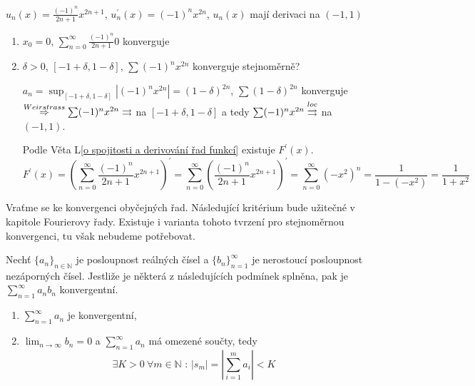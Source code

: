 $u_n(x) = \frac{(-1)^n}{2n+1} x^{2n+1}$, $u_n^\prime (x) = (-1)^n x^{2n}$, $u_n(x)$ mají derivaci na $(-1,1)$
\begin{enumerate}
\item $x_0 = 0$, $\sum_{n=0}^\infty \frac{(-1)^n}{2n+1} 0$ konverguje
\item $\delta > 0$, $[-1+\delta, 1-\delta]$, $\sum (-1)^n x^{2n}$ konverguje stejnoměrně?

$a_n = \sup_{[-1+\delta, 1-\delta]} |(-1)^n x^{2n}| = (1-\delta)^{2n}$, $\sum (1-\delta)^{2n}$ konverguje $\overset{Weirstrass}{\Rightarrow} \sum (-1)^n x^{2n} \rightrightarrows$ na $[-1+\delta, 1-\delta]$ a tedy $\sum (-1)^n x^{2n} \overset{loc}{\rightrightarrows}$ na $(-1,1)$.

Podle Věta L\ref{o spojitosti a derivování řad funkcí} existuje $F^\prime (x)$.
$$F^\prime (x) = \left( \sum_{n=0}^\infty \frac{(-1)^n}{2n+1} x^{2n+1} \right)^\prime = \sum_{n=0}^\infty \left( \frac{(-1)^n}{2n+1} x^{2n+1} \right)^\prime = \sum_{n=0}^\infty (-x^2)^n = \frac{1}{1-(-x^2)} = \frac{1}{1+x^2}$$
\end{enumerate}

Vraťme se ke konvergenci obyčejných řad. Následující kritérium bude užitečné v kapitole Fourierovy řady. Existuje i varianta tohoto tvrzení pro stejnoměrnou konvergenci, tu však nebudeme potřebovat.

\begin{vetabd}
Nechť $\{a_n\}_{n \in \mathbb{N}}$ je posloupnost reálných čísel a $\{b_n\}_{n=1}^{\infty}$ je nerostoucí posloupnost nezáporných čísel. Jestliže je některá z následujících podmínek splněna, pak je $\sum_{n=1}^{\infty} a_n b_n$ konvergentní.
\begin{enumerate}
\item $\sum_{n=1}^{\infty} a_n$ je konvergentní,
\item $\lim_{n \rightarrow \infty} b_n = 0$ a $\sum_{n=1}^{\infty} a_n$ má omezené součty, tedy
$$\exists K > 0 \ \forall m \in \mathbb{N} \textrm{ : } | s_m | = \left| \sum_{i=1}^{m} a_i \right| < K$$
\end{enumerate}
\end{vetabd}

